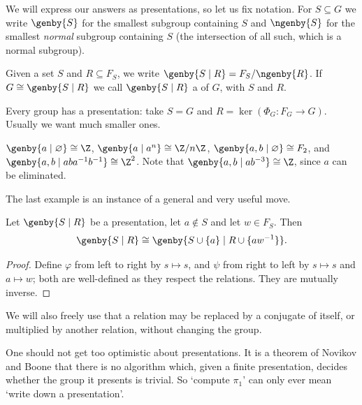 We will express our answers as presentations, so let us fix notation. For $S \subseteq G$
we write $\genby{S}$ for the smallest subgroup containing $S$ and $\ngenby{S}$ for the
smallest \emph{normal} subgroup containing $S$ (the intersection of all such, which is a
normal subgroup).

\begin{definition}[Presentation]
	Given a set $S$ and $R \subseteq F_S$, we write $\genby{S \mid R} = F_S / \ngenby{R}$. If $G \cong \genby{S\mid R}$ we call $\genby{S\mid R}$ a  of $G$, with  $S$ and  $R$.
\end{definition}

Every group has a presentation: take $S = G$ and $R = \ker(\Phi_G: F_G \to G)$. Usually we
want much smaller ones.

\begin{example}
	$\genby{a \mid \varnothing} \cong \Z$, $\genby{a \mid a^n} \cong \Z/n\Z$, $\genby{a, b \mid \varnothing} \cong F_2$, and $\genby{a,b \mid aba^{-1}b^{-1}} \cong \Z^2$. Note that $\genby{a,b\mid ab^{-3}} \cong \Z$, since $a$ can be eliminated.
\end{example}

The last example is an instance of a general and very useful move.

\begin{proposition} \label{prop:tietze}
	Let $\genby{S \mid R}$ be a presentation, let $a \notin S$ and let $w \in F_S$. Then
	$$
	\genby{S \mid R} \cong \genby{S \cup \{a\} \mid R \cup \{aw^{-1}\}}.
	$$
\end{proposition}
\begin{proof}
	Define $\varphi$ from left to right by $s \mapsto s$, and $\psi$ from right to left by $s \mapsto s$ and $a \mapsto w$; both are well-defined as they respect the relations. They are mutually inverse.
\end{proof}

We will also freely use that a relation may be replaced by a conjugate of itself, or
multiplied by another relation, without changing the group.

\begin{remark}
	One should not get too optimistic about presentations. It is a theorem of Novikov and Boone that there is no algorithm which, given a finite presentation, decides whether the group it presents is trivial. So `compute $\pi_1$' can only ever mean `write down a presentation'.
\end{remark}

